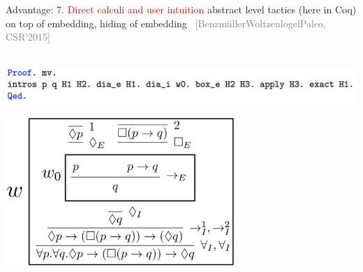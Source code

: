 \documentclass[9pt,mathserif,unknownkeysallowed,xcolor=dvipsnames]{beamer}
\newcommand{\chriscite}[1]{{\small \textcolor{gray}{[#1]}}}
\begin{document}
\begin{frame}{Advantage: \textcolor{red}{7. Direct calculi and user intuition}}
{abstract level tactics (here in Coq) on top of embedding, hiding of embedding}
\ \hfill \chriscite{Benzm\"ullerWoltzenlogelPaleo, CSR'2015}

\\[.5em]
\includegraphics[width=\textwidth]{Images/CoqCode/13.png}

\begin{center}
\includegraphics[width=0.65\textwidth]{Images/CoqCode/MP_Dia.png}
\end{center}
\end{frame}
\end{document}
